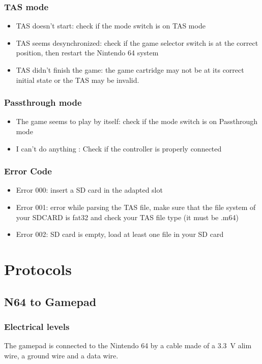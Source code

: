 \documentclass[a4paper,oneside,12pt]{article}
\begin{document}
\subsubsection{TAS mode}
\begin{itemize}
\item TAS doesn't start: check if the mode switch is on TAS mode
\item TAS seems desynchronized: check if the game selector switch is at the
correct position, then restart the Nintendo 64 system
\item TAS didn't finish the game: the game cartridge may not be at its correct
initial state or the TAS may be invalid.
\end{itemize}

\subsubsection{Passthrough mode}
\begin{itemize}
\item The game seems to play by itself: check if the mode switch is on
Passthrough mode
\item I can't do anything : Check if the controller is properly connected
\end{itemize}

\subsubsection{Error Code}
\begin{itemize}
\item Error 000: insert a SD card in the adapted slot
\item Error 001: error while parsing the TAS file, make sure that the file
system of your SDCARD is fat32 and check your TAS file type (it must be .m64)
\item Error 002: SD card is empty, load at least one file in your SD card
\end{itemize}

\section{Protocols}
\subsection{N64 to Gamepad}
\subsubsection{Electrical levels}
The gamepad is connected to the Nintendo 64 by a cable made of a \SI{3.3}{\V}
alim wire, a ground wire and a data wire.
\end{document}
